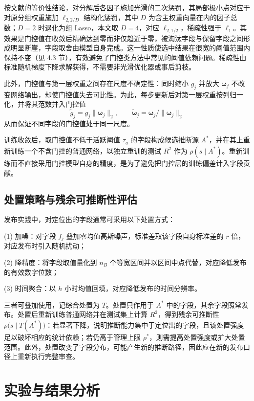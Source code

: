 \documentclass[UTF8,zihao=5,twoside,fontset=none]{ctexart}
\begin{document}
按文献\cite{ref-dgating}的等价性结论，对分解后各因子施加光滑的二次惩罚，其局部极小点对应于对原分组权重施加 $\ell_{2,2/D}$ 结构化惩罚，其中 $D$ 为含主权重向量在内的因子总数；$D=2$ 时退化为组 Lasso，本文取 $D=4$，对应 $\ell_{2,1/2}$，稀疏性强于 $\ell_1$。其效果是门控值在收敛后精确达到零而非仅趋近于零，被淘汰字段与保留字段之间形成明显断崖，字段取舍由模型自身完成。这一性质使选中结果在很宽的阈值范围内保持不变（见 4.3 节），有效避免了门控类方法中常见的阈值依赖问题。稀疏性由标准随机梯度下降求解获得，不需要非光滑优化器或事后剪枝。

此外，门控值与第一层权重之间存在尺度不确定性：同时缩小 $g_j$ 并放大 $\bm{\omega}_j$ 不改变网络输出，却使门控值失去可比性。为此，每步更新后对第一层权重按列归一化，并将其范数并入门控值
\begin{equation}
\tilde g_j=g_j\|\bm{\omega}_j\|_2,\qquad
\tilde{\bm{\omega}}_j=\bm{\omega}_j/\|\bm{\omega}_j\|_2
\end{equation}
从而保证不同字段的门控值处于同一尺度。

训练收敛后，取门控值不低于活跃阈值 $\tau_g$ 的字段构成候选推断源 $A^{\ast}$，并在其上重新训练一个不含门控的普通网络，以独立重训的测试 $R^2$ 作为 $\rho(s\mid A^{\ast})$。重新训练而不直接采用门控模型自身的精度，是为了避免把门控层的训练偏差计入字段贡献。

\subsection{处置策略与残余可推断性评估}

发布实践中，对定位出的字段通常可采用以下处置方式：

(1) 加噪：对字段 $f_j$ 叠加零均值高斯噪声，标准差取该字段自身标准差的 $r$ 倍，对应发布时引入随机扰动；

(2) 降精度：将字段取值量化到 $n_B$ 个等宽区间并以区间中点代替，对应降低发布的有效数字位数；

(3) 时间聚合：以 $h$ 小时均值回填，对应降低发布的时间分辨率。

三者可叠加使用，记综合处置为 $T$。处置只作用于 $A^{\ast}$ 中的字段，其余字段照常发布。处置后重新训练普通网络并在测试集上计算 $R^2$，得到残余可推断性 $\rho\big(s\mid T(A^{\ast})\big)$：若显著下降，说明推断能力集中于定位出的字段，且该处置强度足以破坏相应的统计依赖；若仍高于管理上限 $\rho^{\ast}$，则需提高处置强度或扩大处置范围。此外，处置改变了字段分布，可能产生新的推断路径，因此应在新的发布口径上重新执行完整审查。

\section{实验与结果分析}
\end{document}

